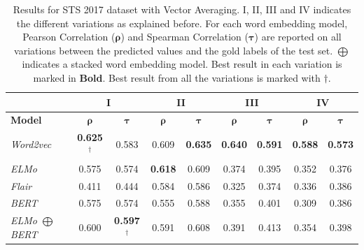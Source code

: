 \begin{enumerate}
\begin{table}[htb]
{\begin{tabular}{|l|cc|cc|cc|cc|}
			\hline & 
			\multicolumn{2}{c|}{\textbf{I}}    & \multicolumn{2}{c|}{\textbf{II}}   & \multicolumn{2}{c|}{\textbf{III}}  &    
			\multicolumn{2}{c|}{\textbf{IV}}   \\ 
			\hline
			\multicolumn{1}{|l|}{\textbf{Model}} 
			&  $\bm{\rho}$   & $\bm{\tau}$      
			&  $\bm{\rho}$   & $\bm{\tau}$  
			&  $\bm{\rho}$   & $\bm{\tau}$  
			&  $\bm{\rho}$   & $\bm{\tau}$  
			\\ \hline
			\textit{Word2vec}                     
			& \textbf{0.625}$^{\dagger}$ & 0.583         
			& 0.609             & \textbf{0.635}       
			& \textbf{0.640}    & \textbf{0.591} 
			& \textbf{0.588}    & \textbf{0.573} \\
			\textit{ELMo}                     
			& 0.575                      & 0.574         
			& \textbf{0.618}             & 0.609       
			& 0.374                      & 0.395  
			& 0.352                      & 0.376 \\
			\textit{Flair}                     
			& 0.411                      & 0.444         
			& 0.584                      & 0.586       
			& 0.325                      & 0.374  
			& 0.336                      & 0.386 \\
			\textit{BERT}                     
			& 0.575                      & 0.574         
			& 0.555                      & 0.588       
			& 0.355                      & 0.401  
			& 0.309                      & 0.386 \\
			\textit{ELMo $\bigoplus$ BERT}                     
			& 0.600                      & \textbf{0.597}$^{\dagger}$         
			& 0.591                      & 0.608       
			& 0.391                      & 0.413  
			& 0.354                      & 0.398 \\
			\hline
		\end{tabular}
	}
	\caption[Results for STS 2017 with Vector Averaging]{Results for STS 2017 dataset with Vector Averaging. I, II, III and IV indicates the different variations as explained before. For each word embedding model, Pearson Correlation ($\bm{\rho}$) and Spearman Correlation ($\bm{\tau}$) are reported on all variations between the predicted values and the gold labels of the test set. $\bigoplus$ indicates a stacked word embedding model. Best result in each variation is marked in \textbf{Bold}. Best result from all the variations is marked with ${\dagger}$. }  
	\label{tab:sts_average_vectors}
\end{table}

\begin{table}[htb]
	\centering
\end{table}
\end{enumerate}
